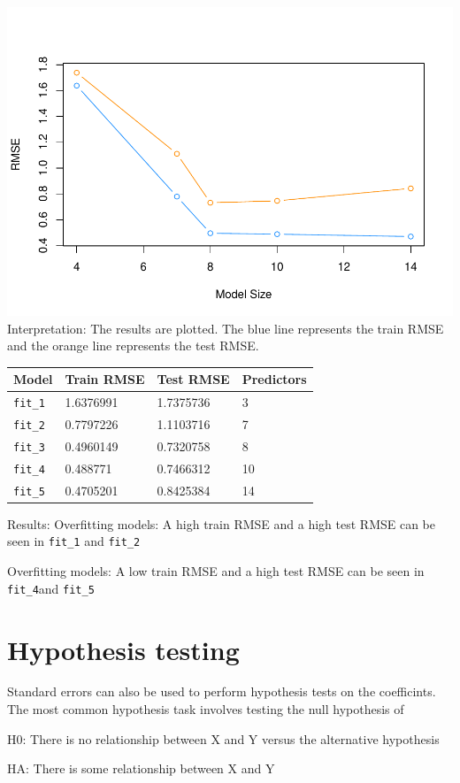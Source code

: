 \documentclass[]{report}
\begin{document}
\includegraphics{MyBook_files/figure-latex/unnamed-chunk-89-1.pdf}
Interpretation: The results are plotted. The blue line represents the
train RMSE and the orange line represents the test RMSE.

\begin{longtable}[]{@{}llll@{}}
\toprule
Model & Train RMSE & Test RMSE & Predictors\tabularnewline
\midrule
\endhead
\texttt{fit\_1} & 1.6376991 & 1.7375736 & 3\tabularnewline
\texttt{fit\_2} & 0.7797226 & 1.1103716 & 7\tabularnewline
\texttt{fit\_3} & 0.4960149 & 0.7320758 & 8\tabularnewline
\texttt{fit\_4} & 0.488771 & 0.7466312 & 10\tabularnewline
\texttt{fit\_5} & 0.4705201 & 0.8425384 & 14\tabularnewline
\bottomrule
\end{longtable}

Results: Overfitting models: A high train RMSE and a high test RMSE can
be seen in \texttt{fit\_1} and \texttt{fit\_2}

Overfitting models: A low train RMSE and a high test RMSE can be seen in
\texttt{fit\_4}and \texttt{fit\_5}

\section{Hypothesis testing}\label{hypothesis-testing}

Standard errors can also be used to perform hypothesis tests on the
coefficints. The most common hypothesis task involves testing the null
hypothesis of

H0: There is no relationship between X and Y versus the alternative
hypothesis

HA: There is some relationship between X and Y
\end{document}

